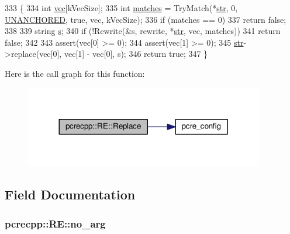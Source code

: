 \begin{DoxyCode}
333                                     \{
334   \textcolor{keywordtype}{int} \hyperlink{group__apr__file__io_ga026ee9293cfdb03a3944adbd192f1ead}{vec}[kVecSize];
335   \textcolor{keywordtype}{int} \hyperlink{pcre_8txt_a21b41f6db4993dc6b82c70ec93bd5af9}{matches} = TryMatch(*\hyperlink{group__MOD__DAV_gaab9226fe8f632e1f998e24276d478f30}{str}, 0, \hyperlink{classpcrecpp_1_1RE_aafe8a162d00ec7a7d6d2ba67652735efa8511ace935198310276d68934194a16a}{UNANCHORED}, \textcolor{keyword}{true}, vec, kVecSize);
336   \textcolor{keywordflow}{if} (matches == 0)
337     \textcolor{keywordflow}{return} \textcolor{keyword}{false};
338 
339   \textcolor{keywordtype}{string} \hyperlink{group__APACHE__CORE__LISTEN_ga9359ed159c8b295541e3770172d34550}{s};
340   \textcolor{keywordflow}{if} (!Rewrite(&s, rewrite, *\hyperlink{group__MOD__DAV_gaab9226fe8f632e1f998e24276d478f30}{str}, vec, matches))
341     \textcolor{keywordflow}{return} \textcolor{keyword}{false};
342 
343   assert(vec[0] >= 0);
344   assert(vec[1] >= 0);
345   \hyperlink{group__MOD__DAV_gaab9226fe8f632e1f998e24276d478f30}{str}->replace(vec[0], vec[1] - vec[0], s);
346   \textcolor{keywordflow}{return} \textcolor{keyword}{true};
347 \}
\end{DoxyCode}


Here is the call graph for this function\+:
\nopagebreak
\begin{figure}[H]
\begin{center}
\leavevmode
\includegraphics[width=296pt]{classpcrecpp_1_1RE_aa71d225a11f4627f31631ed3d72aae3d_cgraph}
\end{center}
\end{figure}




\subsection{Field Documentation}
\subsubsection[{\texorpdfstring{no\+\_\+arg}{no_arg}}]{ pcrecpp\+::\+R\+E\+::no\+\_\+arg\hspace{0.3cm}{\ttfamily [static]}}\hypertarget{classpcrecpp_1_1RE_a596c7c964ad0e41415540e12ee73d302}{}\label{classpcrecpp_1_1RE_a596c7c964ad0e41415540e12ee73d302}


